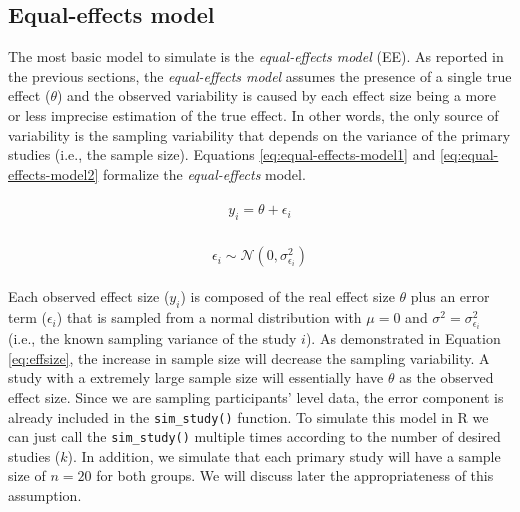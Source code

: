 \documentclass[
  man,floatsintext]{apa6}
\begin{document}
\normalsize

\subsection{Equal-effects model}\label{equal-effects-model}

The most basic model to simulate is the \emph{equal-effects model} (EE). As reported in the previous sections, the \emph{equal-effects model} assumes the presence of a single true effect (\(\theta\)) and the observed variability is caused by each effect size being a more or less imprecise estimation of the true effect. In other words, the only source of variability is the sampling variability that depends on the variance of the primary studies (i.e., the sample size). Equations \eqref{eq:equal-effects-model1} and \eqref{eq:equal-effects-model2} formalize the \emph{equal-effects} model.

\begin{align}
\begin{gathered}
y_i = \theta + \epsilon_i
\label{eq:equal-effects-model1}
\end{gathered}
\end{align}

\begin{align}
\begin{gathered}
\epsilon_i \sim \mathcal{N}(0,\sigma_{\epsilon_i}^{2})
\label{eq:equal-effects-model2}
\end{gathered}
\end{align}

Each observed effect size (\(y_{i}\)) is composed of the real effect size \(\theta\) plus an error term (\(\epsilon_{i}\)) that is sampled from a normal distribution with \(\mu = 0\) and \(\sigma^{2} = \sigma_{\epsilon_i}^{2}\) (i.e., the known sampling variance of the study \(i\)). As demonstrated in Equation \eqref{eq:effsize}, the increase in sample size will decrease the sampling variability. A study with a extremely large sample size will essentially have \(\theta\) as the observed effect size. Since we are sampling participants' level data, the error component is already included in the \texttt{sim\_study()} function. To simulate this model in R we can just call the \texttt{sim\_study()} multiple times according to the number of desired studies (\(k\)). In addition, we simulate that each primary study will have a sample size of \(n = 20\) for both groups. We will discuss later the appropriateness of this assumption.

\scriptsize
\end{document}
